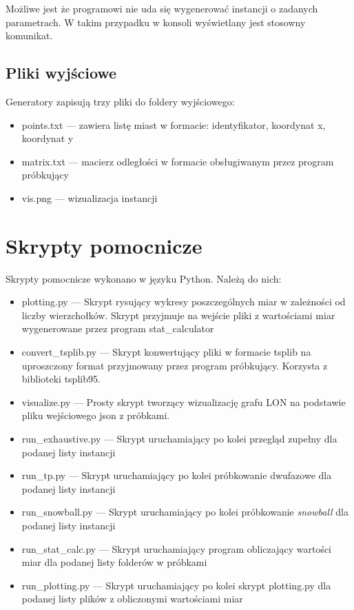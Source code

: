 Możliwe jest że programowi nie uda się wygenerować instancji o zadanych parametrach. W takim przypadku w konsoli wyświetlany jest stosowny komunikat.

\subsection{Pliki wyjściowe}
Generatory zapisują trzy pliki do foldery wyjściowego:
\begin{itemize}
    \item points.txt --- zawiera listę miast w formacie: identyfikator, koordynat x, koordynat y
    \item matrix.txt --- macierz odległości w formacie obsługiwanym przez program próbkujący
    \item vis.png --- wizualizacja instancji
\end{itemize}

\section{Skrypty pomocnicze}
Skrypty pomocnicze wykonano w języku Python.
Należą do nich:
\begin{itemize}
    \item plotting.py --- Skrypt rysujący wykresy poszczególnych miar w zależności od liczby wierzchołków. Skrypt przyjmuje na wejście pliki z wartościami miar wygenerowane przez program stat\_calculator
    \item convert\_tsplib.py --- Skrypt konwertujący pliki w formacie tsplib na uproszczony format przyjmowany przez program próbkujący. Korzysta z biblioteki tsplib95.
    \item visualize.py --- Prosty skrypt tworzący wizualizację grafu LON na podstawie pliku wejściowego json z próbkami.
    \item run\_exhaustive.py --- Skrypt uruchamiający po kolei przegląd zupełny dla podanej listy instancji
    \item run\_tp.py --- Skrypt uruchamiający po kolei próbkowanie dwufazowe dla podanej listy instancji
    \item run\_snowball.py --- Skrypt uruchamiający po kolei próbkowanie \textit{snowball} dla podanej listy instancji
    \item run\_stat\_calc.py --- Skrypt uruchamiający program obliczający wartości miar dla podanej listy folderów w próbkami
    \item run\_plotting.py --- Skrypt uruchamiający po kolei skrypt plotting.py dla podanej listy plików z obliczonymi wartościami miar
\end{itemize}

